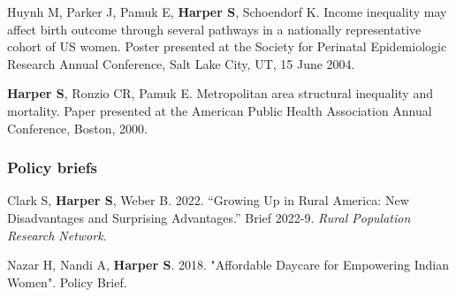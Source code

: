 \documentclass[
  letterpaper,
  DIV=11,
  numbers=noendperiod]{scrartcl}
\begin{document}
\begin{etaremune}
\item   Huynh M, Parker J, Pamuk E, \textbf{Harper S}, Schoendorf K. Income inequality may affect birth outcome through several pathways in a nationally representative cohort of US women.  Poster presented at the Society for Perinatal Epidemiologic Research Annual Conference, Salt Lake City, UT, 15 June 2004.

\item   \textbf{Harper S}, Ronzio CR, Pamuk E.  Metropolitan area structural inequality and mortality.  Paper presented at the American Public Health Association Annual Conference, Boston, 2000.

\end{etaremune}

\subsubsection{Policy briefs}\label{policy-briefs}

\begin{etaremune}

\item Clark S, \textbf{Harper S}, Weber B. 2022. “Growing Up in Rural America: New Disadvantages and Surprising Advantages.” Brief 2022-9. \emph{Rural Population Research Network}.

\item Nazar H, Nandi A, \textbf{Harper S}. 2018. "Affordable Daycare for Empowering Indian Women". Policy Brief.

\end{etaremune}
\end{document}

